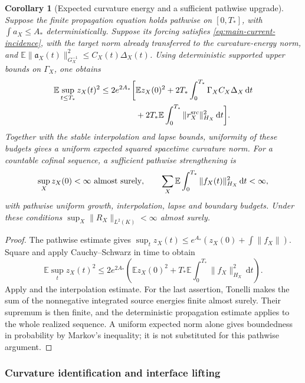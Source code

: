 \documentclass[11pt]{article}
\newtheorem{corollary}[corollary]{Corollary}
\theoremstyle{definition}
\theoremstyle{remark}
\newcommand{\dd}{\mathrm d}
\begin{document}
\begin{corollary}[Expected curvature energy and a sufficient pathwise upgrade]
\label{cor:supp-stochastic-curvature}
Suppose the finite propagation equation holds pathwise on $[0,T_*]$, with
$\int a_X\le A_*$ deterministically.  Suppose its forcing satisfies
\eqref{eq:main-current-incidence}, with the target norm already transferred
to the curvature-energy norm, and
$\mathbb E\|\mathfrak a_X(t)\|_{G_X^{-1}}^2\le C_X(t)\Delta_X(t)$.
Using deterministic supported upper bounds on $\Gamma_X$, one obtains
\begin{equation}
 \begin{split}
 \mathbb E\sup_{t\le T_*}z_X(t)^2
 \le 2e^{2A_*}\bigg[&\mathbb Ez_X(0)^2
       +2T_*\int_0^{T_*}\Gamma_XC_X\Delta_X\,\dd t\\
       &+2T_*\mathbb E\int_0^{T_*}\|r_X^{\rm src}\|_{H_X}^2\,\dd t\bigg].
 \end{split}
 \label{eq:supp-expected-curvature}
\end{equation}
Together with the stable interpolation and lapse bounds, uniformity of these
budgets gives a uniform expected squared spacetime curvature norm.  For a
countable cofinal sequence, a sufficient pathwise strengthening is
\begin{equation}
 \sup_Xz_X(0)<\infty\ \hbox{almost surely},\qquad
 \sum_X\mathbb E\int_0^{T_*}\|f_X(t)\|_{H_X}^2\,\dd t<\infty,
 \label{eq:supp-pathwise-source-budget}
\end{equation}
with pathwise uniform growth, interpolation, lapse and boundary budgets.
Under these conditions $\sup_X\|R_X\|_{L^2(K)}<\infty$ almost surely.
\end{corollary}
\begin{proof}
The pathwise estimate gives
$\sup_tz_X(t)\le e^{A_*}(z_X(0)+\int\|f_X\|)$.
Square and apply Cauchy--Schwarz in time to obtain
\[
 \mathbb E\sup_tz_X(t)^2
 \le2e^{2A_*}\left(\mathbb Ez_X(0)^2
       +T_*\mathbb E\int_0^{T_*}\|f_X\|_{H_X}^2\,\dd t\right).
\]
Apply  and the interpolation estimate.
For the last assertion, Tonelli makes the sum of the nonnegative integrated
source energies finite almost surely.  Their supremum is then finite, and
the deterministic propagation estimate applies to the whole realized
sequence.  A uniform expected norm alone gives boundedness in probability
by Markov's inequality; it is not substituted for this pathwise argument.
\end{proof}

\subsubsection{Curvature identification and interface lifting}
\end{document}
